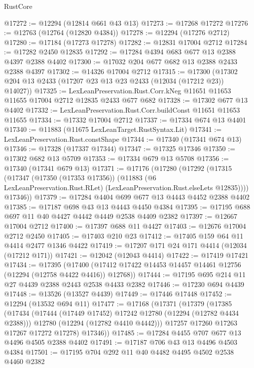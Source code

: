\begin{lexlean}{RustCore}
\begin{coremodule}
@17272 := @12294 (@12814 @661 @43 @13)
@17273 := @17268 @17272
@17276 := @12763 (@12764 (@12820 @4384))
@17278 := @12294 (@17276 @2712)
@17280 := @17184 (@17273 @17278)
@17282 := @12831 @17004 @2712
@17284 := @17282 @2450 @12835
@17292 := @17284 @4394 @683 @677 @13 @2388 @4397 @2388 @4402
@17300 := @17032 @204 @677 @682 @13 @2388 @2433 @2388 @4397
@17302 := @14326 @17004 @2712
@17315 := @17300 (@17302 @204 @13 @2433 (@17207 @23 @13 @23 @2433 (@12034 (@17212 @23)) @14027))
@17325 := LexLeanPreservation.Rust.Corr.kNeg
    @11651
    @11653
    @11655
    @17004
    @2712
    @12835
    @2433
    @677
    @682
@17328 := @17302 @677 @13 @4402
@17332 := LexLeanPreservation.Rust.Corr.buildConst @11651 @11653 @11655
@17334 := @17332 @17004 @2712
@17337 := @17334 @674 @13 @4401
@17340 := @11883 (@11675 LexLeanTarget.RustSyntax.Lit)
@17341 := LexLeanPreservation.Rust.constShape
@17344 := @17340 (@17341 @674 @13)
@17346 := @17328 (@17337 @17344)
@17347 := @17325 @17346
@17350 := @17302 @682 @13 @5709
@17353 := @17334 @679 @13 @5708
@17356 := @17340 (@17341 @679 @13)
@17371 := @17176
    (@17280
      (@17292
        (@17315
          (@17347
            (@17350 (@17353 @17356))
            (@11883 (@6 LexLeanPreservation.Rust.RLet) (LexLeanPreservation.Rust.elseLets @12835))))
        @17346))
@17379 := @17284 @4404 @699 @677 @13 @4443 @4452 @2388 @4402
@17385 := @17187 @698 @43 @13 @4443 @4450 @4384
@17395 := @17195 @688 @697 @11 @40 @4427 @4442 @4449 @2538 @4409 @2382
@17397 := @12667 @17004 @2712
@17400 := @17397 @688 @11 @4427
@17403 := @12676 @17004 @2712 @2450
@17405 := @17403 @210 @23
@17412 := @17405 @159 @64 @11 @4414 @2477 @1346 @4422
@17419 := @17207 @171 @24 @171 @4414 (@12034 (@17212 @171))
@17421 := @12042 (@12043 @4414)
@17422 := @17419 @17421
@17434 := @17395
    (@17400 (@17412 @17422 @14453 @14457 @14461 @12756 (@12294 (@12758 @4422 @4416)) @12768))
@17444 := @17195 @695 @214 @11 @27 @4439 @2388 @2443 @2538 @4433 @2382
@17446 := @17230 @694 @4439
@17448 := @13526 (@13527 @4439)
@17449 := @17446 @17448
@17452 := @12294 (@13532 @694 @11)
@17477 := @17168
    (@17371
      (@17379
        (@17385
          (@17434
            (@17444 (@17449 @17452) @17242 @12780 (@12294 (@12782 @4434 @2388)))
            @12780
            (@12294 (@12782 @4410 @4442)))
          @17257
          @17260
          @17263
          @17267
          @17272
          @17278)
        @17346))
@17485 := @17284 @4455 @707 @677 @13 @4496 @4505 @2388 @4402
@17491 := @17187 @706 @43 @13 @4496 @4503 @4384
@17501 := @17195 @704 @292 @11 @40 @4482 @4495 @4502 @2538 @4460 @2382

\end{coremodule}
\end{lexlean}
